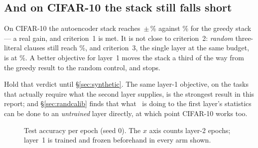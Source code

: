 \subsection{And on CIFAR-10 the stack still falls short}

\begin{ttkey}
On CIFAR-10 the autoencoder stack reaches \accMctmAuto{}\,$\pm$\,\stdMctmAuto{}\% against
\accMctm{}\% for the greedy stack --- a real gain, and criterion~1 is met. It is not close to
criterion~2: \emph{random} three-literal clauses still reach \accMctmRandom{}\%, and
criterion~3, the single layer at the same budget, is at \accSingleMatched{}\%. A better
objective for layer~1 moves the stack a third of the way from the greedy result to the random
control, and stops.

Hold that verdict until \S\ref{sec:synthetic}. The same layer-1 objective, on the tasks that
actually require what the second layer supplies, is the strongest result in this report; and
\S\ref{sec:randcalib} finds that what \ideaA\ is doing to the first layer's statistics can be
done to an \emph{untrained} layer directly, at which point CIFAR-10 works too.
\end{ttkey}

\begin{figure}[h]
\centering
{}
\caption{Test accuracy per epoch (seed 0). The $x$ axis counts layer-2 epochs; layer~1 is
trained and frozen beforehand in every arm shown.}
\label{fig:curves-auto}
\end{figure}

